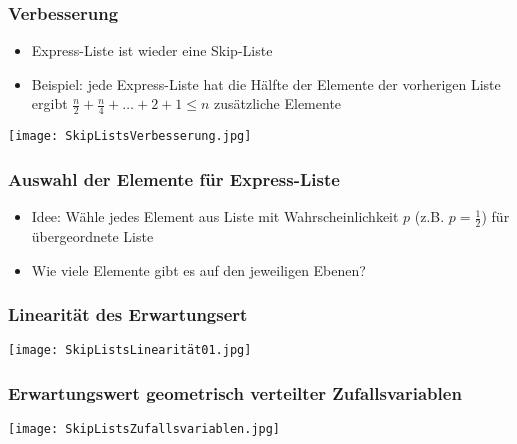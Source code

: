 		\subsubsection{Verbesserung}
			\begin{minipage}{0.5\textwidth}
				\begin{itemize}
					\item Express-Liste ist wieder eine Skip-Liste
					\item Beispiel: jede Express-Liste hat die Hälfte der Elemente der vorherigen Liste \\
						ergibt $\frac{n}{2} + \frac{n}{4} + \dots + 2 + 1 \leq n$ zusätzliche Elemente
				\end{itemize}
			\end{minipage}
			\hspace{1cm}
			\begin{minipage}{0.45\textwidth}
				\begin{center}
					\texttt{[image: SkipListsVerbesserung.jpg]}
				\end{center}
			\end{minipage}


		\subsubsection{Auswahl der Elemente für Express-Liste}
			\begin{itemize}
				\item Idee: Wähle jedes Element aus Liste mit Wahrscheinlichkeit
					$p$ (z.B. $p=\frac{1}{2}$) für übergeordnete Liste
				\item Wie viele Elemente gibt es auf den jeweiligen Ebenen?
			\end{itemize}


		\begin{minipage}[t]{0.5\textwidth}
			\subsubsection{Linearität des Erwartungsert}
			\texttt{[image: SkipListsLinearität01.jpg]}
		\end{minipage}
		\begin{minipage}[t]{0.45\textwidth}
			\subsubsection{Erwartungswert geometrisch verteilter Zufallsvariablen}
			\begin{center}
				\texttt{[image: SkipListsZufallsvariablen.jpg]}
			\end{center}
		\end{minipage}



